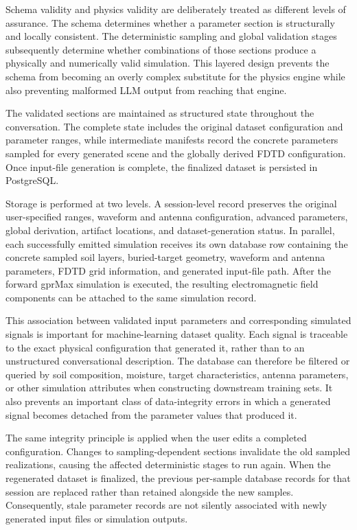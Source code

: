 \documentclass[journal]{IEEEtran}
\begin{document}
Schema validity and physics validity are deliberately treated as different levels of assurance. The schema determines whether a parameter section is structurally and locally consistent. The deterministic sampling and global validation stages subsequently determine whether combinations of those sections produce a physically and numerically valid simulation. This layered design prevents the schema from becoming an overly complex substitute for the physics engine while also preventing malformed LLM output from reaching that engine.

The validated sections are maintained as structured state throughout the conversation. The complete state includes the original dataset configuration and parameter ranges, while intermediate manifests record the concrete parameters sampled for every generated scene and the globally derived FDTD configuration. Once input-file generation is complete, the finalized dataset is persisted in PostgreSQL.

Storage is performed at two levels. A session-level record preserves the original user-specified ranges, waveform and antenna configuration, advanced parameters, global derivation, artifact locations, and dataset-generation status. In parallel, each successfully emitted simulation receives its own database row containing the concrete sampled soil layers, buried-target geometry, waveform and antenna parameters, FDTD grid information, and generated input-file path. After the forward gprMax simulation is executed, the resulting electromagnetic field components can be attached to the same simulation record.

This association between validated input parameters and corresponding simulated signals is important for machine-learning dataset quality. Each signal is traceable to the exact physical configuration that generated it, rather than to an unstructured conversational description. The database can therefore be filtered or queried by soil composition, moisture, target characteristics, antenna parameters, or other simulation attributes when constructing downstream training sets. It also prevents an important class of data-integrity errors in which a generated signal becomes detached from the parameter values that produced it.

The same integrity principle is applied when the user edits a completed configuration. Changes to sampling-dependent sections invalidate the old sampled realizations, causing the affected deterministic stages to run again. When the regenerated dataset is finalized, the previous per-sample database records for that session are replaced rather than retained alongside the new samples. Consequently, stale parameter records are not silently associated with newly generated input files or simulation outputs.
\end{document}
